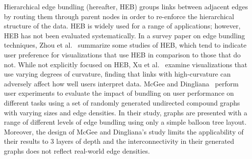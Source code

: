 \documentclass[a4paper]{llncs}
\begin{document}
Hierarchical edge bundling (hereafter, HEB) groups links between adjacent edges by routing them through parent nodes in order to re-enforce the hierarchical structure of the data. HEB is widely used for a range of applications; however, HEB has not been evaluated systematically. In a survey paper on edge bundling techniques, Zhou et al.~\cite{zhou2013edge} summarize some studies of HEB, which tend to indicate user preference for visualizations that use HEB in comparison to those that do not. While not explicitly focused on HEB, Xu et al.~\cite{xu2012user} examine visualizations that use varying degrees of curvature, finding that links with high-curvature can adversely affect how well users interpret data. %
McGee and Dingliana~\cite{McGee2012StudyHEB} perform user experiments to evaluate the impact of bundling on user performance on different tasks using a set of randomly generated undirected compound graphs with varying sizes and edge densities. In their study, graphs are presented with a range of different levels of edge bundling using only a simple balloon tree layout. Moreover, the design of McGee and Dingliana's study limits the applicability of their results to 3 layers of depth and the interconnectivity in their generated graphs does not reflect real-world edge densities. %


\end{document}
